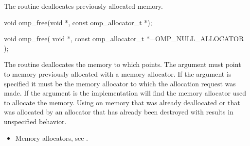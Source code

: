 \begin{ccppspecific}
\summary
The  routine deallocates previously allocated memory.

\format

\begin{cspecific}
\begin{ompcFunction}
void omp_free(void *, const omp_allocator_t *);
\end{ompcFunction}
\end{cspecific}
\begin{cppspecific}
\begin{ompcFunction}
void omp_free(
  void *,
  const omp_allocator_t *=OMP_NULL_ALLOCATOR
);
\end{ompcFunction}
\end{cppspecific}

\effect

The  routine deallocates the memory to which  points. The  argument must point to memory previously allocated with a memory allocator. If the  argument is specified it must be the memory allocator to which the allocation request was made. If the  argument is  the implementation will find the memory allocator used to allocate the memory. Using  on memory that was already deallocated or that was allocated by an allocator that has already been destroyed with  results in unspecified behavior.

\crossreferences
\begin{itemize}
\item Memory allocators, see .
\end{itemize}

\end{ccppspecific}
